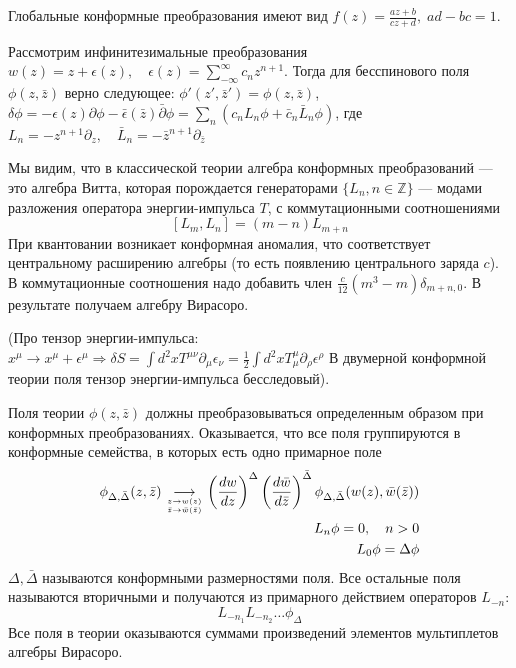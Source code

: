 \documentclass[a4paper,12pt]{article}
\theoremstyle{definition} \newtheorem{Def}{Definition}
\begin{document}
Глобальные конформные преобразования имеют вид $f(z)=\frac{az+b}{cz+d},\; ad-bc=1$. 

Рассмотрим инфинитезимальные преобразования $w(z)=z+\epsilon(z),\quad
\epsilon(z)=\sum_{-\infty}^{\infty}c_nz^{n+1}$. 
Тогда для бесспинового поля $\phi(z,\bar z)$ верно следующее: $\phi'(z',\bar z')=\phi(z,\bar z)$,
$\delta\phi=-\epsilon(z)\partial\phi-\bar \epsilon(\bar z)\bar \partial \phi=\sum_n(c_n L_n\phi+\bar
c_n\bar L_n\phi)$, где $L_n=-z^{n+1}\partial_z,\quad \bar L_n=-\bar z^{n+1}\partial_{\bar z}$

Мы видим, что в классической теории алгебра конформных преобразований --- это алгебра Витта, которая
порождается генераторами $\{L_n, n\in \mathbb{Z}\}$ --- модами разложения оператора энергии-импульса $T$, с
коммутационными соотношениями
\begin{equation}
  \label{eq:2}
  [L_m,L_n]=(m-n)L_{m+n}
\end{equation}
При квантовании возникает конформная аномалия, что соответствует центральному расширению алгебры (то
есть появлению центрального заряда $c$). В коммутационные соотношения надо добавить член
$\frac{c}{12}(m^3-m)\delta_{m+n,0}$. В результате получаем алгебру Вирасоро.

(Про тензор энергии-импульса:
$x^{\mu}\to x^{\mu}+\epsilon^{\mu}\Rightarrow \delta S=\int d^2 x
T^{\mu\nu}\partial_{\mu}\epsilon_{\nu}=
\frac{1}{2}\int d^2 xT_{\mu}^{\mu}\partial_{\rho}\epsilon^{\rho}$
В двумерной конформной теории поля тензор энергии-импульса бесследовый).

Поля теории $\phi(z,\bar z)$ должны преобразовываться определенным образом при конформных преобразованиях.
Оказывается, что все поля группируются в конформные семейства, в которых есть одно примарное поле
\begin{equation}
  \label{eq:3}
  \begin{split}
    \phi_{\Delta,\bar \Delta}(z,\bar z)\underset{
      \genfrac{}{}{0pt}{}{z\to w(z)}
        {\bar z \to \bar w(\bar z)}
    }
    {\longrightarrow} \left(\frac{dw}{dz}\right)^{\Delta}\left(\frac{d\bar w}{d\bar
        z}\right)^{\bar\Delta}\phi_{\Delta,\bar \Delta}(w(z),\bar w(\bar z))\\
    L_n \phi=0,\quad n>0\\
    L_0 \phi=\Delta \phi\\
  \end{split}
\end{equation}
$\Delta, \bar \Delta$ называются конформными размерностями поля.
Все остальные поля называются вторичными и получаются из примарного действием операторов $L_{-n}$:
\begin{equation}
  \label{eq:67}
  L_{-n_1}L_{-n_2}\dots \phi_{\Delta}
\end{equation}
Все поля в теории оказываются суммами произведений элементов мультиплетов алгебры Вирасоро.
\end{document}
